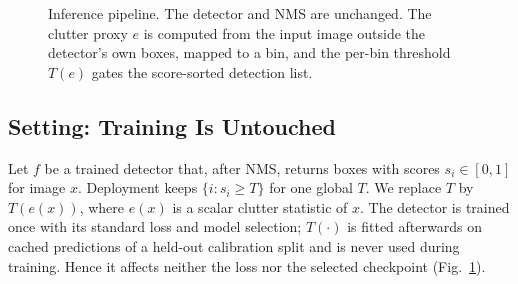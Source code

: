 \documentclass[journal]{IEEEtran}
\providecommand{\linelabel}[1]{}
\begin{document}
\begin{figure}[t]
  \centering
  \caption{Inference pipeline. The detector and NMS are unchanged. The
           clutter proxy $e$ is computed from the input image outside the
           detector's own boxes, mapped to a bin, and the per-bin threshold
           $T(e)$ gates the score-sorted detection list.}
  \label{fig:pipeline}
\end{figure}

\subsection{Setting: Training Is Untouched}
\label{sec:setting}
\linelabel{ln:train}Let $f$ be a trained detector that, after NMS, returns boxes with scores
$s_i\in[0,1]$ for image $x$. Deployment keeps $\{i: s_i\ge T\}$ for one
global $T$. We replace $T$ by $T(e(x))$, where $e(x)$ is a scalar clutter
statistic of $x$. The detector is trained once with its standard loss and
model selection; $T(\cdot)$ is fitted afterwards on cached predictions of a
held-out calibration split and is never used during training. Hence it
affects neither the loss nor the selected checkpoint (Fig.~\ref{fig:pipeline}).\linelabel{ln:trainend}
\end{document}

